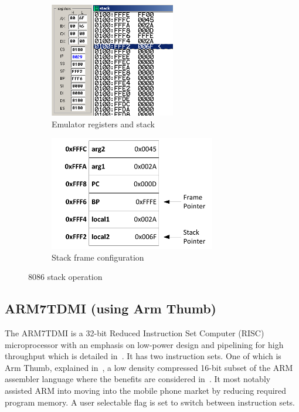 \documentclass[12pt,a4paper]{article}
\begin{document}
\begin{figure}[htb]
        \centering
        \begin{subfigure}[b]{0.5\textwidth}
                \includegraphics[height=5cm]{Figures/emu.png}
                \caption{Emulator registers and stack}
                \label{fig:emu}
        \end{subfigure}%
        \begin{subfigure}[b]{0.5\textwidth}
                \includegraphics[height=5cm]{Figures/stack.pdf}
                \caption{Stack frame configuration}
                \label{fig:stack}
        \end{subfigure}
        \caption{8086 stack operation}
        \label{fig:8086}
\end{figure}







\subsection{ARM7TDMI (using Arm Thumb)}
The ARM7TDMI is a 32-bit Reduced Instruction Set Computer (RISC) microprocessor with an emphasis on low-power design and pipelining for high throughput which is detailed in~\cite{ARM7TDMI}.
It has two instruction sets. 
One of which is Arm Thumb, explained in~\cite{arm}, a low density compressed 16-bit subset of the ARM assembler language where the benefits are considered in~\cite{ARMs}.
It most notably assisted ARM into moving into the mobile phone market by reducing required program memory. 
A user selectable flag is set to switch between instruction sets.
\end{document}
